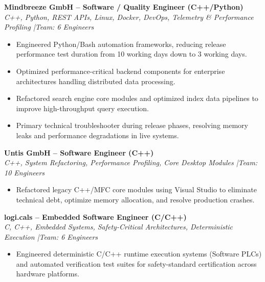 \documentclass[10pt,a4paper]{article}
\begin{document}

\textbf{Mindbreeze GmbH -- Software / Quality Engineer (C++/Python)} \\
\textit{C++, Python, REST APIs, Linux, Docker, DevOps, Telemetry \& Performance Profiling \quad|\quad Team: 6 Engineers}
\begin{itemize}
     \item Engineered Python/Bash automation frameworks, reducing release performance test duration from 10 working days down to 3 working days.
     \item Optimized performance-critical backend components for enterprise architectures handling distributed data processing.
     \item Refactored search engine core modules and optimized index data pipelines to improve high-throughput query execution.
     \item Primary technical troubleshooter during release phases, resolving memory leaks and performance degradations in live systems.
\end{itemize}

\vspace{0.15cm}
\textbf{Untis GmbH -- Software Engineer (C++)} \\
\textit{C++, System Refactoring, Performance Profiling, Core Desktop Modules \quad|\quad Team: 10 Engineers}
\begin{itemize}
    \item Refactored legacy C++/MFC core modules using Visual Studio to eliminate technical debt, optimize memory allocation, and resolve production crashes.
\end{itemize}

\newpage
\vspace{0.15cm}
\textbf{logi.cals -- Embedded Software Engineer (C/C++)} \\
\textit{C, C++, Embedded Systems, Safety-Critical Architectures, Deterministic Execution \quad|\quad Team: 6 Engineers}
\begin{itemize}
    \item Engineered deterministic C/C++ runtime execution systems (Software PLCs) and automated verification test suites for safety-standard certification across hardware platforms.
\end{itemize}
\end{document}
